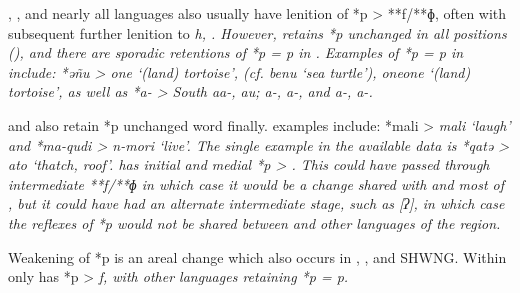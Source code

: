 , , and nearly all 
languages also usually have lenition of *p > **f/**ɸ,
often with subsequent further lenition to \it{h, {\0}}.
However,  retains *p unchanged in all positions (),
and there are sporadic retentions of *p = \it{p} in .
Examples of *p = \it{p} in  include: *əñu > 
\it{one} ‘(land) tortoise’, (cf.
 \it{benu} ‘sea turtle’),
 \it{one{\tl}one} ‘(land) tortoise’,
as well as *a-  > South  \it{aa-,
au};  \it{a-, a-},
and  \it{a-, a-}.

 and  also retain *p unchanged word finally.
 examples include: *mali > \it{mali} ‘laugh’
and *ma-qudi > \it{n-mori} ‘live’. The single
 example in the available data is *qatə > \it{ato} ‘thatch, roof’.
 has initial and medial *p > {\0}.
This could have passed through intermediate **f/**ɸ in which
case it would be a change shared with 
and most of ,
but it could have had an alternate intermediate stage,
such as [ʔ], in which case the reflexes of *p would not be shared
between  and other languages of the region.

Weakening of *p is an areal change which also occurs
in , , and SHWNG.
Within  only  has *p > \it{f},
with other  languages retaining *p = \it{p}.

